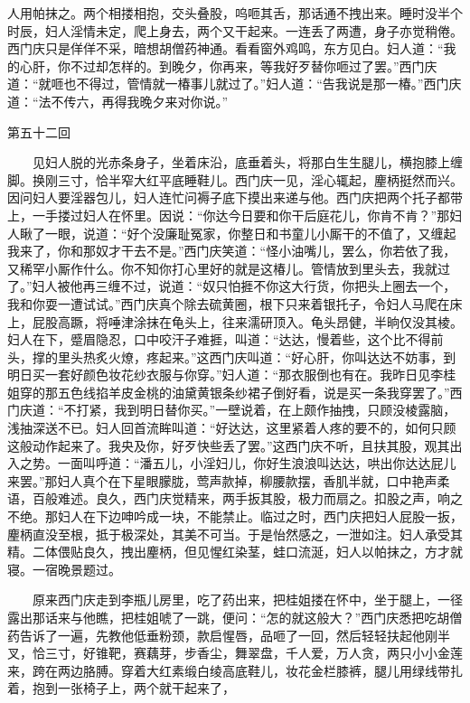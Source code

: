 人用帕抹之。两个相搂相抱，交头叠股，呜咂其舌，那话通不拽出来。睡时没半个时辰，妇人淫情未定，爬上身去，两个又干起来。一连丢了两遭，身子亦觉稍倦。西门庆只是佯佯不采，暗想胡僧药神通。看看窗外鸡鸣，东方见白。妇人道：“我的心肝，你不过却怎样的。到晚夕，你再来，等我好歹替你咂过了罢。”西门庆道：“就咂也不得过，管情就一椿事儿就过了。”妇人道：“告我说是那一椿。”西门庆道：“法不传六，再得我晚夕来对你说。”


第五十二回

　　见妇人脱的光赤条身子，坐着床沿，底垂着头，将那白生生腿儿，横抱膝上缠脚。换刚三寸，恰半窄大红平底睡鞋儿。西门庆一见，淫心辄起，麈柄挺然而兴。因问妇人要淫器包儿，妇人连忙问褥子底下摸出来递与他。西门庆把两个托子都带上，一手搂过妇人在怀里。因说：“你达今日要和你干后庭花儿，你肯不肯？”那妇人瞅了一眼，说道：“好个没廉耻冤家，你整日和书童儿小厮干的不值了，又缠起我来了，你和那奴才干去不是。”西门庆笑道：“怪小油嘴儿，罢么，你若依了我，又稀罕小厮作什么。你不知你打心里好的就是这椿儿。管情放到里头去，我就过了。”妇人被他再三缠不过，说道：“奴只怕捱不你这大行货，你把头上圈去一个，我和你耍一遭试试。”西门庆真个除去硫黄圈，根下只来着银托子，令妇人马爬在床上，屁股高蹶，将唾津涂抹在龟头上，往来濡研顶入。龟头昂健，半晌仅没其棱。妇人在下，蹙眉隐忍，口中咬汗子难捱，叫道：“达达，慢着些，这个比不得前头，撑的里头热炙火燎，疼起来。”这西门庆叫道：“好心肝，你叫达达不妨事，到明日买一套好颜色妆花纱衣服与你穿。”妇人道：“那衣服倒也有在。我昨日见李桂姐穿的那五色线掐羊皮金桃的油黛黄银条纱裙子倒好看，说是买一条我穿罢了。”西门庆道：“不打紧，我到明日替你买。”一壁说着，在上颇作抽拽，只顾没棱露脑，浅抽深送不已。妇人回首流眸叫道：“好达达，这里紧着人疼的要不的，如何只顾这般动作起来了。我央及你，好歹快些丢了罢。”这西门庆不听，且扶其股，观其出入之势。一面叫呼道：“潘五儿，小淫妇儿，你好生浪浪叫达达，哄出你达达屁儿来罢。”那妇人真个在下星眼朦胧，莺声款掉，柳腰款摆，香肌半就，口中艳声柔语，百般难述。良久，西门庆觉精来，两手扳其股，极力而扇之。扣股之声，响之不绝。那妇人在下边呻吟成一块，不能禁止。临过之时，西门庆把妇人屁股一扳，麈柄直没至根，抵于极深处，其美不可当。于是怡然感之，一泄如注。妇人承受其精。二体偎贴良久，拽出麈柄，但见惺红染茎，蛙口流涎，妇人以帕抹之，方才就寝。一宿晚景题过。


　　原来西门庆走到李瓶儿房里，吃了药出来，把桂姐搂在怀中，坐于腿上，一径露出那话来与他瞧，把桂姐唬了一跳，便问：“怎的就这般大？”西门庆悉把吃胡僧药告诉了一遍，先教他低垂粉颈，款启惺唇，品咂了一回，然后轻轻扶起他刚半叉，恰三寸，好锥靶，赛藕芽，步香尘，舞翠盘，千人爱，万人贪，两只小小金莲来，跨在两边胳膊。穿着大红素缎白绫高底鞋儿，妆花金栏膝裤，腿儿用绿线带扎着，抱到一张椅子上，两个就干起来了，

